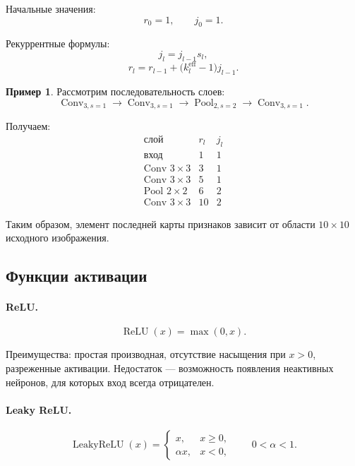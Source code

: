 \documentclass[12pt,a4paper]{article}
\newcommand{\ReLU}{\operatorname{ReLU}}
\numberwithin{equation}{section}
\theoremstyle{definition}
\newtheorem{example}[theorem]{Пример}
\theoremstyle{remark}
\begin{document}
Начальные значения:
\[
    r_0=1,
    \qquad
    j_0=1.
\]

Рекуррентные формулы:
\[
    j_l=j_{l-1}s_l,
\]
\[
    r_l
    =
    r_{l-1}
    +
    \bigl(k_l^{\mathrm{eff}}-1\bigr)j_{l-1}.
\]

\begin{example}
Рассмотрим последовательность слоев:
\[
    \operatorname{Conv}_{3,s=1}
    \to
    \operatorname{Conv}_{3,s=1}
    \to
    \operatorname{Pool}_{2,s=2}
    \to
    \operatorname{Conv}_{3,s=1}.
\]

Получаем:
\[
\begin{array}{c|c|c}
    \text{слой} & r_l & j_l\\
    \hline
    \text{вход} & 1 & 1\\
    \text{Conv }3\times3 & 3 & 1\\
    \text{Conv }3\times3 & 5 & 1\\
    \text{Pool }2\times2 & 6 & 2\\
    \text{Conv }3\times3 & 10 & 2
\end{array}
\]

Таким образом, элемент последней карты признаков зависит от области
\(10\times10\) исходного изображения.
\end{example}

\subsection{Функции активации}

\paragraph{ReLU.}
\[
    \ReLU(x)=\max(0,x).
\]

Преимущества: простая производная, отсутствие насыщения при \(x>0\),
разреженные активации. Недостаток --- возможность появления
неактивных нейронов, для которых вход всегда отрицателен.

\paragraph{Leaky ReLU.}
\[
    \operatorname{LeakyReLU}(x)
    =
    \begin{cases}
        x, & x\geq 0,\\
        \alpha x, & x<0,
    \end{cases}
    \qquad 0<\alpha<1.
\]
\end{document}
